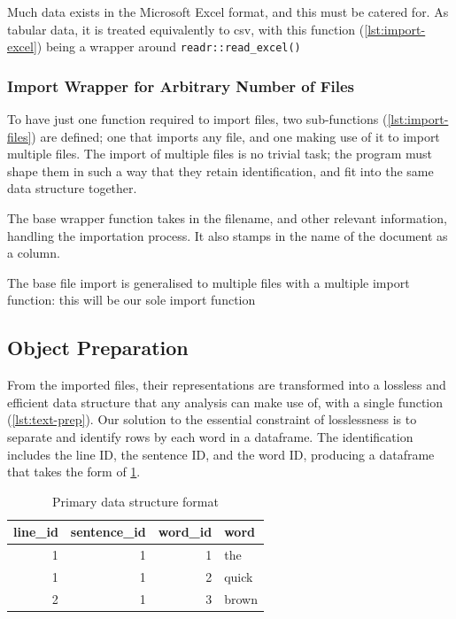 \documentclass[11pt, a4paper, twoside, titlepage]{report}
\begin{document}
Much data exists in the Microsoft Excel format, and this must be
catered for. As tabular data, it is treated equivalently to csv, with
this function (\cref{lst:import-excel}) being a wrapper around
\texttt{readr::read_excel()}

\subsubsection{Import Wrapper for Arbitrary Number of Files}

To have just one function required to import files, two sub-functions
(\cref{lst:import-files}) are defined; one that imports any file,
and one making use of it to import multiple files. The import of
multiple files is no trivial task; the program must shape them in such
a way that they retain identification, and fit into the same
data structure together.

The base wrapper function takes in the filename, and other relevant
information, handling the importation process. It also stamps in the
name of the document as a column.

The base file import is generalised to multiple files with a multiple
import function: this will be our sole import function

\subsection{Object Preparation}

From the imported files, their representations are transformed into a
lossless and efficient data structure that any analysis can make use
of, with a single function (\cref{lst:text-prep}). Our solution to
the essential constraint of losslessness is to separate and identify
rows by each word in a dataframe. The identification includes the line
ID, the sentence ID, and the word ID, producing a dataframe that takes
the form of \cref{tab:data-base}.

\begin{table}[h]
  \centering
  
  \begin{tabular}{rrrl}
    line\_id & sentence\_id & word\_id & word\\
    \toprule
    1 & 1 & 1 & the\\
    1 & 1 & 2 & quick\\
    2 & 1 & 3 & brown\\
  \end{tabular}  
  \caption{Primary data structure format}\label{tab:data-base}
\end{table}
\end{document}
